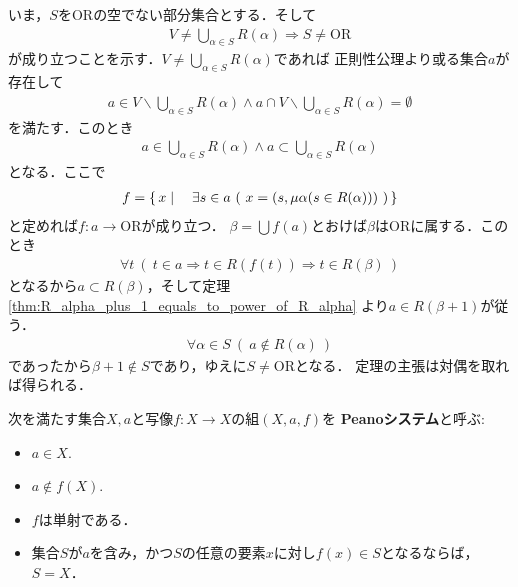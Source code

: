 	\begin{prf}
		いま，$S$を$\mathrm{OR}$の空でない部分集合とする．そして
		\begin{align}
			V \neq \bigcup_{\alpha \in S} R(\alpha)
			\Longrightarrow S \neq \mathrm{OR}
		\end{align}
		が成り立つことを示す．$V \neq \bigcup_{\alpha \in S} R(\alpha)$であれば
		正則性公理より或る集合$a$が存在して
		\begin{align}
			a \in V \backslash \bigcup_{\alpha \in S} R(\alpha)
			\wedge a \cap V \backslash \bigcup_{\alpha \in S} R(\alpha) = \emptyset
		\end{align}
		を満たす．このとき
		\begin{align}
			a \in \bigcup_{\alpha \in S} R(\alpha) \wedge a \subset \bigcup_{\alpha \in S} R(\alpha)
		\end{align}
		となる．ここで
		\begin{align}
			f = \left\{\, x \mid \quad \exists s \in a\ (\ x = (s,\mu \alpha (s \in R(\alpha)))\ )\, \right\}
		\end{align}
		と定めれば$f:a \longrightarrow \mathrm{OR}$が成り立つ．
		$\beta = \bigcup f(a)$とおけば$\beta$は$\mathrm{OR}$に属する．このとき
		\begin{align}
			\forall t\ (\ t \in a \Longrightarrow t \in R(f(t))
			\Longrightarrow t \in R(\beta)\ )
		\end{align}
		となるから$a \subset R(\beta)$，そして定理\ref{thm:R_alpha_plus_1_equals_to_power_of_R_alpha}
		より$a \in R(\beta + 1)$が従う．
		\begin{align}
			\forall \alpha \in S\ (\ a \notin R(\alpha)\ )
		\end{align}
		であったから$\beta + 1 \notin S$であり，ゆえに$S \neq \mathrm{OR}$となる．
		定理の主張は対偶を取れば得られる．
		\QED
	\end{prf}
	
	\begin{screen}
		\begin{dfn}[Peanoシステム]
			次を満たす集合$X,a$と写像$f:X \longrightarrow X$の組$(X,a,f)$を
			{\bf Peanoシステム}と呼ぶ:
			\begin{itemize}
				\item $a \in X$.
				\item $a \notin f(X)$.
				\item $f$は単射である．
				\item 集合$S$が$a$を含み，かつ$S$の任意の要素$x$に対し$f(x) \in S$となるならば，$S = X$．
			\end{itemize}
		\end{dfn}
	\end{screen}
	
